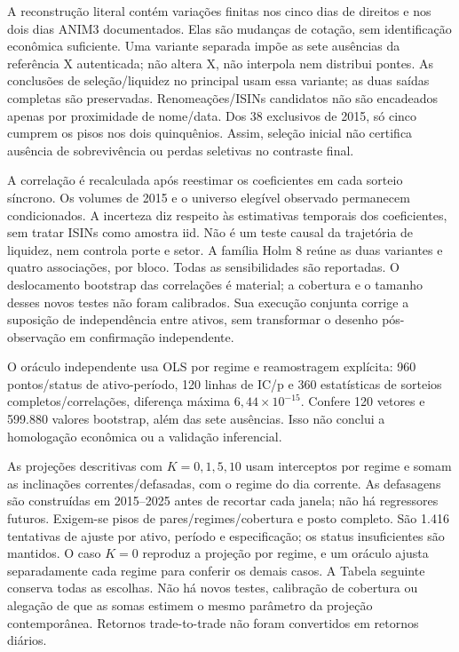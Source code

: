 \documentclass[12 pt]{article}
\begin{document}
A reconstrução literal contém variações finitas nos cinco dias de
direitos e nos dois dias ANIM3 documentados. Elas são mudanças de cotação,
sem identificação econômica suficiente. Uma variante separada impõe
as sete ausências da referência X autenticada; não altera X, não
interpola nem distribui pontes. As conclusões de seleção/liquidez
no principal usam essa variante; as duas saídas completas são preservadas.
Renomeações/ISINs candidatos não são encadeados apenas por proximidade
de nome/data. Dos 38 exclusivos de 2015, só cinco cumprem os pisos
nos dois quinquênios. Assim, seleção inicial não certifica ausência
de sobrevivência ou perdas seletivas no contraste final.

A correlação é recalculada após reestimar os coeficientes em cada
sorteio síncrono. Os volumes de 2015 e o universo elegível observado
permanecem condicionados. A incerteza diz respeito às estimativas
temporais dos coeficientes, sem tratar ISINs como amostra iid.
Não é um teste causal da trajetória de liquidez, nem controla porte
e setor. A família Holm 8 reúne as duas variantes e quatro associações,
por bloco. Todas as sensibilidades são reportadas. O deslocamento
bootstrap das correlações é material; a cobertura e o tamanho desses
novos testes não foram calibrados. Sua execução conjunta corrige
a suposição de independência entre ativos, sem transformar o desenho
pós-observação em confirmação independente.

\begin{table}[!htbp]\centering\small
\caption{Associações de postos: p ajustado por Holm 8 em cada bloco.
Coortes originais/união, variantes literal e com lacunas. Viés é a
diferença entre média bootstrap e ponto, bloco 21; não uma correção validada.}

\end{table}

O oráculo independente usa OLS por regime e reamostragem explícita:
960 pontos/status de ativo-período, 120 linhas de IC/p e 360 estatísticas
de sorteios completos/correlações, diferença máxima $6,44\times 10^{-15}$.
Confere 120 vetores e 599.880 valores bootstrap, além das sete ausências.
Isso não conclui a homologação econômica ou a validação inferencial.


As projeções descritivas com $K=0,1,5,10$ usam interceptos por regime
e somam as inclinações correntes/defasadas, com o regime do dia corrente.
As defasagens são construídas em 2015--2025 antes de recortar cada janela;
não há regressores futuros. Exigem-se pisos de pares/regimes/cobertura
e posto completo. São 1.416 tentativas de ajuste por ativo, período e
especificação; os status insuficientes são mantidos. O caso $K=0$
reproduz a projeção por regime, e um oráculo ajusta separadamente cada
regime para conferir os demais casos. A Tabela seguinte conserva todas
as escolhas. Não há novos testes, calibração de cobertura ou alegação
de que as somas estimem o mesmo parâmetro da projeção contemporânea.
Retornos trade-to-trade não foram convertidos em retornos diários.
\end{document}
